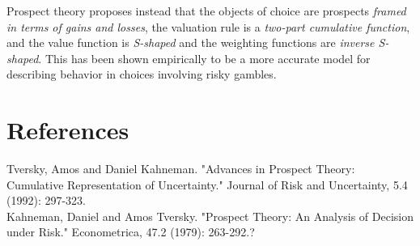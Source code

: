\documentclass[a4paper,12pt]{article}
\numberwithin{equation}{section}
\theoremstyle{definition}
\begin{document}
Prospect theory proposes instead that the objects of choice are prospects \textit{framed in terms of gains and losses}, the valuation rule is a \textit{two-part cumulative function}, and the value function is \textit{S-shaped} and the weighting functions are \textit{inverse S-shaped}. This has been shown empirically to be a more accurate model for describing behavior in choices involving risky gambles.
\\

\section{References}
\noindent
\hangindent=0.7cm
Tversky, Amos and Daniel Kahneman. "Advances in Prospect Theory: Cumulative Representation of Uncertainty." Journal of Risk and Uncertainty, 5.4 (1992): 297-323.\\

\noindent
\hangindent=0.7cm
Kahneman, Daniel and Amos Tversky. "Prospect Theory: An Analysis of Decision under Risk." Econometrica, 47.2 (1979): 263-292.?\\
\end{document}
